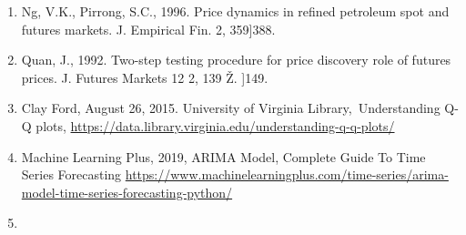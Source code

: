 \documentclass[12pt,twoside]{article}
\begin{document}
\begin{enumerate}
	\item {\fontsize{9pt}{10.8pt}\selectfont Ng, V.K., Pirrong, S.C., 1996. Price dynamics in refined petroleum spot and futures markets. J. Empirical Fin. 2, 359]388.\par}\par

	\item {\fontsize{9pt}{10.8pt}\selectfont Quan, J., 1992. Two-step testing procedure for price discovery role of futures prices. J. Futures Markets 12 2, 139 Ž. ]149. \par}\par

	\item {\fontsize{9pt}{10.8pt}\selectfont Clay Ford, August 26, 2015. University of Virginia Library,\  Understanding Q-Q plots, \href{https://data.library.virginia.edu/understanding-q-q-plots/}{https://data.library.virginia.edu/understanding-q-q-plots/}\par}\par

	\item {\fontsize{9pt}{10.8pt}\selectfont Machine Learning Plus, 2019, ARIMA Model, Complete Guide To Time Series Forecasting \href{https://www.machinelearningplus.com/time-series/arima-model-time-series-forecasting-python/}{https://www.machinelearningplus.com/time-series/arima-model-time-series-forecasting-python/} \par}\par

	\item 
\end{enumerate}
\vspace{\baselineskip}\begin{justify}
{\fontsize{11pt}{13.2pt}\selectfont \par}
\end{justify}
\vspace{\baselineskip}
\printbibliography
\end{document}
